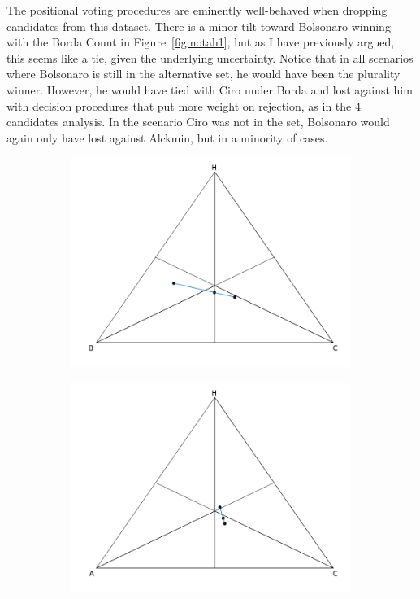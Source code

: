 \documentclass[hidelinks,11pt]{article} \usepackage[utf8]{inputenc}
\begin{document}
The positional voting procedures are eminently well-behaved when dropping
candidates from this dataset. There is a minor tilt toward Bolsonaro winning
with the Borda Count in Figure~\ref{fig:notah1}, but as I have previously
argued, this seems like a tie, given the underlying uncertainty. Notice that in
all scenarios where Bolsonaro is still in the alternative set, he would have
been the plurality winner. However, he would have tied with Ciro under Borda and
lost against him with decision procedures that put more weight on rejection, as
in the 4 candidates analysis. In the scenario Ciro was not in the set, Bolsonaro
would again only have lost against Alckmin, but in a minority of cases.


   \begin{figure}[!h] \centering
        \begin{subfigure}[b]{0.475\textwidth} \centering
\includegraphics[width=\textwidth]{./images/cw1_nota.png}
             \caption{}%
            \label{fig:notac1}
        \end{subfigure} \hfill
        \begin{subfigure}[b]{0.475\textwidth} \centering
\includegraphics[width=\textwidth]{./images/cw1_notb.png}

\end{subfigure}
\end{figure}
\end{document}
